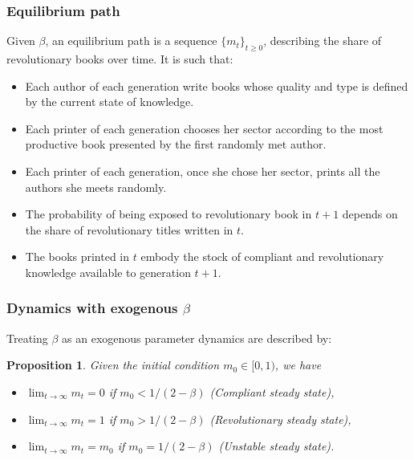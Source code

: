 \documentclass[aspectratio=169,red,12pt]{beamer}
\newtheorem{proposition}{Proposition}
\begin{document}
\begin{frame}
	\frametitle{Equilibrium path}
\begin{definition}\label{definition:equilibrium}
	Given $\beta$, an equilibrium path is a sequence $\{m_t\}_{t\geq0}$, describing the share of revolutionary books over time. It is such that:
	\begin{itemize}
		\item Each author of each generation write books whose quality and type is defined by the current state of knowledge.
		\item Each printer of each generation chooses her sector according to the most productive book presented by the first randomly met author.
		\item Each printer of each generation, once she chose her sector, prints all the authors she meets randomly.
		\item The probability of being exposed to revolutionary book in $t+1$ depends on the share of revolutionary titles written in $t$.
		\item The books printed in $t$ embody the stock of compliant and revolutionary knowledge available to generation $t+1$.
	\end{itemize}
\end{definition}
	
\end{frame}

\begin{frame}
	\frametitle{Dynamics with exogenous $\beta$}
Treating $\beta$ as an exogenous parameter dynamics are described by:\\ \vspace{0.3cm}
\begin{proposition}
	Given the initial condition $m_0\in[0,1)$, we have
	\begin{itemize}
		\item[i)]$\lim_{t\to\infty}m_t=0$ if $m_0<1/(2-\beta)$ (Compliant steady state),
		\item[ii)] $\lim_{t\to\infty}m_t=1$ if $m_0>1/(2-\beta)$ (Revolutionary steady state),
		\item[iii)]$\lim_{t\to\infty}m_t=m_0$ if $m_0=1/(2-\beta)$ (Unstable steady state).
	\end{itemize}
	\label{proposition:dynex}
\end{proposition}
\end{frame}
\end{document}
